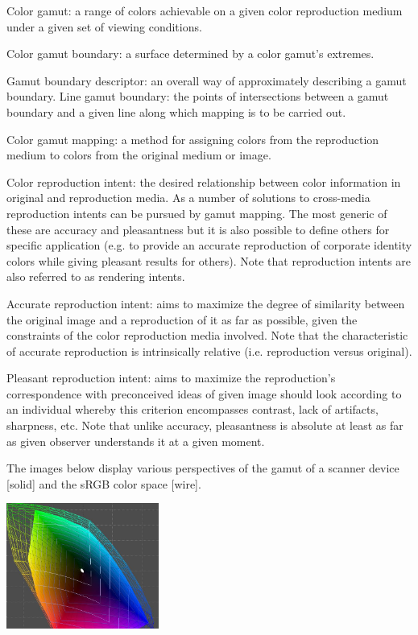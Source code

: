 \documentclass{amsart}
\theoremstyle{definition}
\theoremstyle{remark}
\numberwithin{equation}{section}
\begin{document}
Color gamut: a range of colors achievable on a given color reproduction medium under a given set of viewing conditions.

Color gamut boundary: a surface determined by a color gamut's extremes.

Gamut boundary descriptor: an overall way of approximately describing a gamut boundary.
Line gamut boundary: the points of intersections between a gamut boundary and a given line along which mapping is to be carried out.

Color gamut mapping: a method for assigning colors from the reproduction medium to colors from the
original medium or image.

Color reproduction intent: the desired relationship between color information in original and
reproduction media. As a number of solutions to cross-media reproduction intents can be pursued by
gamut mapping. The most generic of these are accuracy and pleasantness but it is also possible to
define others for specific application (e.g. to provide an accurate reproduction of corporate
identity colors while giving pleasant results for others). Note that reproduction intents are also
referred to as rendering intents.

Accurate reproduction intent: aims to maximize the degree of similarity between the original image
and a reproduction of it as far as possible, given the constraints of the color reproduction media
involved. Note that the characteristic of accurate reproduction is intrinsically relative (i.e.
reproduction versus original).

Pleasant reproduction intent: aims to maximize the reproduction's correspondence with preconceived
ideas of given image should look according to an individual whereby this criterion encompasses
contrast, lack of artifacts, sharpness, etc. Note that unlike accuracy, pleasantness is absolute at
least as far as given observer understands it at a given moment.

The images below display various perspectives of the gamut of a scanner device [solid] and the sRGB color space [wire].

\includegraphics[width=5.0cm]{images/aperio_sRGB_v1.jpg}
\end{document}
